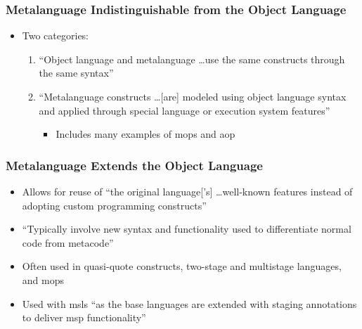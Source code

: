 \subsubsection{Metalanguage Indistinguishable from the Object Language
      \cite[p.~113:28-29]{lilis_survey_2019}}
\begin{itemize}
      \item Two categories:
            \begin{enumerate}
                  \item ``Object language and metalanguage \dots use the same
                        constructs through the same syntax''
                  \item ``Metalanguage constructs \dots [are] modeled using
                        object language syntax and applied through special
                        language or execution system features''
                        \cite[p.~113:28]{lilis_survey_2019}
                        \begin{itemize}
                              \item Includes many examples of \acsp{mop} and
                                    \acs{aop} \cite[p.~113:28]{lilis_survey_2019}
                        \end{itemize}
            \end{enumerate}
\end{itemize}

\subsubsection{Metalanguage Extends the Object Language
      \cite[p.~113:29]{lilis_survey_2019}}
\begin{itemize}
      \item Allows for reuse of ``the original language['s] \dots well-known
            features instead of adopting custom programming constructs''
            \cite[p.~113:29]{lilis_survey_2019}
      \item ``Typically involve new syntax and functionality used to
            differentiate normal code from metacode''
            \cite[p.~113:29]{lilis_survey_2019}
      \item Often used in quasi-quote constructs, two-stage and multistage
            languages, and \acsp{mop} \cite[p.~113:29]{lilis_survey_2019}
      \item Used with \acsp{msl} ``as the base languages are extended with
            staging annotations to deliver \acs{msp} functionality''
            \cite[p.~113:31]{lilis_survey_2019}
\end{itemize}

